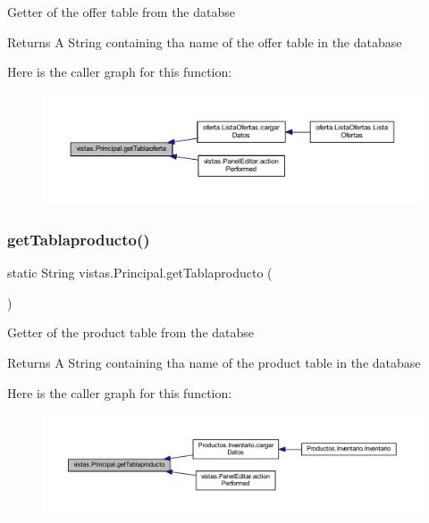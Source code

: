 Getter of the offer table from the databse \begin{DoxyReturn}{Returns}
A String containing tha name of the offer table in the database 
\end{DoxyReturn}
Here is the caller graph for this function\+:
\nopagebreak
\begin{figure}[H]
\begin{center}
\leavevmode
\includegraphics[width=350pt]{classvistas_1_1_principal_afe7ddf018ad429301b1aca1dbfc4770d_icgraph}
\end{center}
\end{figure}
\mbox{\label{classvistas_1_1_principal_a39c3c478060c985a23f97e38dc88e61b}} 
\subsubsection{\texorpdfstring{get\+Tablaproducto()}{getTablaproducto()}}
{\footnotesize\ttfamily static String vistas.\+Principal.\+get\+Tablaproducto (\begin{DoxyParamCaption}{ }\end{DoxyParamCaption})\hspace{0.3cm}{\ttfamily [static]}}

Getter of the product table from the databse \begin{DoxyReturn}{Returns}
A String containing tha name of the product table in the database 
\end{DoxyReturn}
Here is the caller graph for this function\+:
\nopagebreak
\begin{figure}[H]
\begin{center}
\leavevmode
\includegraphics[width=350pt]{classvistas_1_1_principal_a39c3c478060c985a23f97e38dc88e61b_icgraph}
\end{center}
\end{figure}
\mbox{\label{classvistas_1_1_principal_a004b49e26858496e0f5097a079b3aba5}} 
